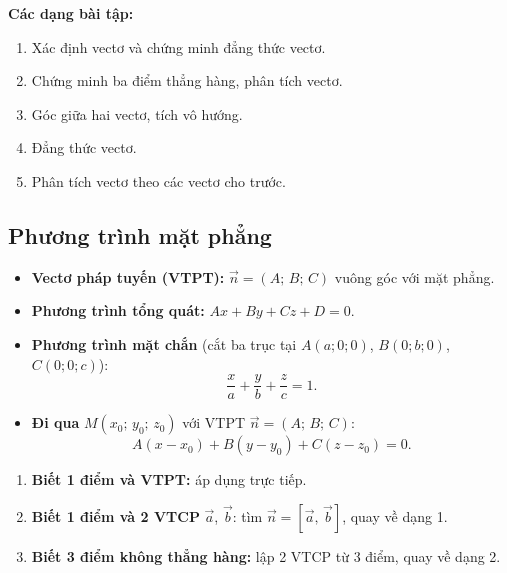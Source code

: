 \documentclass[12pt,a4paper]{article}
\begin{document}
\medskip\noindent\textbf{Các dạng bài tập:}
\begin{enumerate}[label=\textbf{Dạng \arabic*:}, leftmargin=*, align=left]
  \item Xác định vectơ và chứng minh đẳng thức vectơ.
  \item Chứng minh ba điểm thẳng hàng, phân tích vectơ.
  \item Góc giữa hai vectơ, tích vô hướng.
  \item Đẳng thức vectơ.
  \item Phân tích vectơ theo các vectơ cho trước.
\end{enumerate}

\subsection{Phương trình mặt phẳng}

\begin{dinhnghia}
  \begin{itemize}
    \item \textbf{Vectơ pháp tuyến (VTPT):} $\vec{n} = (A;\, B;\, C)$ vuông góc với mặt phẳng.
    \item \textbf{Phương trình tổng quát:} $Ax + By + Cz + D = 0$.
    \item \textbf{Phương trình mặt chắn} (cắt ba trục tại $A(a;0;0)$, $B(0;b;0)$, $C(0;0;c)$):
      \[
        \frac{x}{a} + \frac{y}{b} + \frac{z}{c} = 1.
      \]
    \item \textbf{Đi qua} $M(x_0;\, y_0;\, z_0)$ với VTPT $\vec{n} = (A;\, B;\, C)$:
      \[
        A(x - x_0) + B(y - y_0) + C(z - z_0) = 0.
      \]
  \end{itemize}
\end{dinhnghia}

\begin{phuongphap}[title={Viết phương trình mặt phẳng}]
  \begin{enumerate}
    \item \textbf{Biết 1 điểm và VTPT:} áp dụng trực tiếp.
    \item \textbf{Biết 1 điểm và 2 VTCP} $\vec{a}$, $\vec{b}$:
      tìm $\vec{n} = [\vec{a},\, \vec{b}]$, quay về dạng 1.
    \item \textbf{Biết 3 điểm không thẳng hàng:}
      lập 2 VTCP từ 3 điểm, quay về dạng 2.
  \end{enumerate}
\end{phuongphap}
\end{document}

